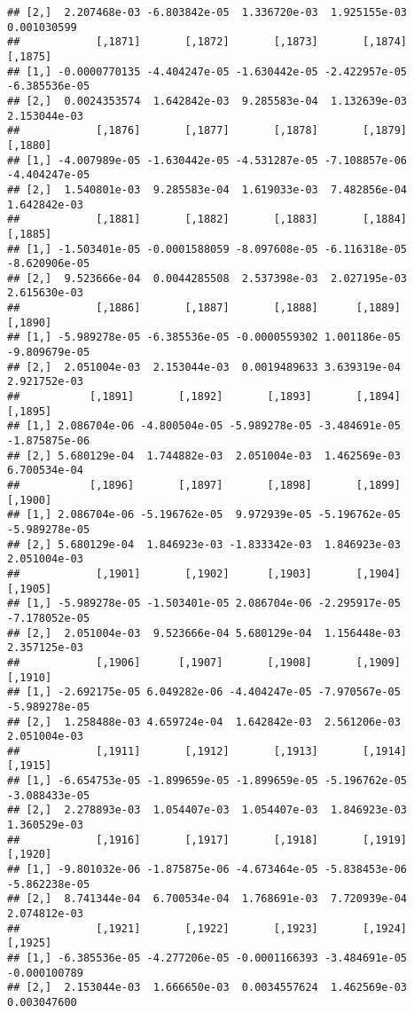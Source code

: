 \documentclass[
]{article}
\begin{document}
\begin{verbatim}
## [2,]  2.207468e-03 -6.803842e-05  1.336720e-03  1.925155e-03  0.001030599
##            [,1871]       [,1872]       [,1873]       [,1874]       [,1875]
## [1,] -0.0000770135 -4.404247e-05 -1.630442e-05 -2.422957e-05 -6.385536e-05
## [2,]  0.0024353574  1.642842e-03  9.285583e-04  1.132639e-03  2.153044e-03
##            [,1876]       [,1877]       [,1878]       [,1879]       [,1880]
## [1,] -4.007989e-05 -1.630442e-05 -4.531287e-05 -7.108857e-06 -4.404247e-05
## [2,]  1.540801e-03  9.285583e-04  1.619033e-03  7.482856e-04  1.642842e-03
##            [,1881]       [,1882]       [,1883]       [,1884]       [,1885]
## [1,] -1.503401e-05 -0.0001588059 -8.097608e-05 -6.116318e-05 -8.620906e-05
## [2,]  9.523666e-04  0.0044285508  2.537398e-03  2.027195e-03  2.615630e-03
##            [,1886]       [,1887]       [,1888]      [,1889]       [,1890]
## [1,] -5.989278e-05 -6.385536e-05 -0.0000559302 1.001186e-05 -9.809679e-05
## [2,]  2.051004e-03  2.153044e-03  0.0019489633 3.639319e-04  2.921752e-03
##           [,1891]       [,1892]       [,1893]       [,1894]       [,1895]
## [1,] 2.086704e-06 -4.800504e-05 -5.989278e-05 -3.484691e-05 -1.875875e-06
## [2,] 5.680129e-04  1.744882e-03  2.051004e-03  1.462569e-03  6.700534e-04
##           [,1896]       [,1897]       [,1898]       [,1899]       [,1900]
## [1,] 2.086704e-06 -5.196762e-05  9.972939e-05 -5.196762e-05 -5.989278e-05
## [2,] 5.680129e-04  1.846923e-03 -1.833342e-03  1.846923e-03  2.051004e-03
##            [,1901]       [,1902]      [,1903]       [,1904]       [,1905]
## [1,] -5.989278e-05 -1.503401e-05 2.086704e-06 -2.295917e-05 -7.178052e-05
## [2,]  2.051004e-03  9.523666e-04 5.680129e-04  1.156448e-03  2.357125e-03
##            [,1906]      [,1907]       [,1908]       [,1909]       [,1910]
## [1,] -2.692175e-05 6.049282e-06 -4.404247e-05 -7.970567e-05 -5.989278e-05
## [2,]  1.258488e-03 4.659724e-04  1.642842e-03  2.561206e-03  2.051004e-03
##            [,1911]       [,1912]       [,1913]       [,1914]       [,1915]
## [1,] -6.654753e-05 -1.899659e-05 -1.899659e-05 -5.196762e-05 -3.088433e-05
## [2,]  2.278893e-03  1.054407e-03  1.054407e-03  1.846923e-03  1.360529e-03
##            [,1916]       [,1917]       [,1918]       [,1919]       [,1920]
## [1,] -9.801032e-06 -1.875875e-06 -4.673464e-05 -5.838453e-06 -5.862238e-05
## [2,]  8.741344e-04  6.700534e-04  1.768691e-03  7.720939e-04  2.074812e-03
##            [,1921]       [,1922]       [,1923]       [,1924]      [,1925]
## [1,] -6.385536e-05 -4.277206e-05 -0.0001166393 -3.484691e-05 -0.000100789
## [2,]  2.153044e-03  1.666650e-03  0.0034557624  1.462569e-03  0.003047600

\end{verbatim}
\end{document}
